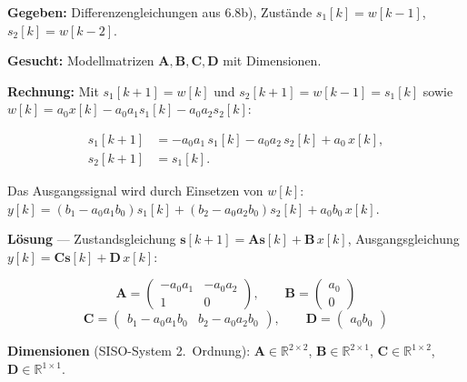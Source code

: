 \begin{beispiel}[6.8c) Zustandsraummodell]

\textbf{Gegeben:} Differenzengleichungen aus 6.8b), Zustände
$s_1[k]=w[k-1]$, $s_2[k]=w[k-2]$.

\textbf{Gesucht:} Modellmatrizen $\mathbf{A},\mathbf{B},\mathbf{C},\mathbf{D}$
mit Dimensionen.

\textbf{Rechnung:} Mit $s_1[k+1]=w[k]$ und $s_2[k+1]=w[k-1]=s_1[k]$ sowie
$w[k]=a_0 x[k]-a_0 a_1 s_1[k]-a_0 a_2 s_2[k]$:

$$
\begin{aligned}
s_1[k+1]&=-a_0 a_1\,s_1[k]-a_0 a_2\,s_2[k]+a_0\,x[k],\\
s_2[k+1]&=s_1[k].
\end{aligned}
$$

Das Ausgangssignal wird durch Einsetzen von $w[k]$:
$y[k]=(b_1-a_0 a_1 b_0)s_1[k]+(b_2-a_0 a_2 b_0)s_2[k]+a_0 b_0\,x[k]$.

\textbf{Lösung} — Zustandsgleichung $\mathbf{s}[k+1]=\mathbf{A}\mathbf{s}[k]+\mathbf{B}\,x[k]$,
Ausgangsgleichung $y[k]=\mathbf{C}\mathbf{s}[k]+\mathbf{D}\,x[k]$:

$$
\boxed{\;
\mathbf{A}=\begin{pmatrix} -a_0 a_1 & -a_0 a_2\\[2pt] 1 & 0\end{pmatrix},\qquad
\mathbf{B}=\begin{pmatrix} a_0\\[2pt] 0\end{pmatrix}
\;}
$$
$$
\boxed{\;
\mathbf{C}=\begin{pmatrix} b_1-a_0 a_1 b_0 & b_2-a_0 a_2 b_0\end{pmatrix},\qquad
\mathbf{D}=\begin{pmatrix} a_0 b_0\end{pmatrix}
\;}
$$

\textbf{Dimensionen} (SISO-System 2.~Ordnung): $\mathbf{A}\in\mathbb{R}^{2\times2}$,
$\mathbf{B}\in\mathbb{R}^{2\times1}$, $\mathbf{C}\in\mathbb{R}^{1\times2}$,
$\mathbf{D}\in\mathbb{R}^{1\times1}$.

\end{beispiel}

